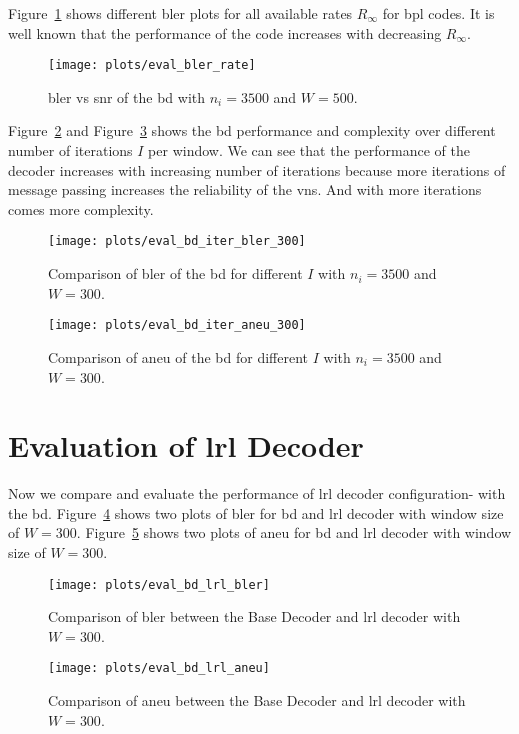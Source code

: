 Figure~\ref{fig:eval_bler_rate} shows different \ac{bler} plots for all available rates $R_\infty$ for \ac{bpl} codes. It is well known that the performance of the code increases with decreasing $R_\infty$.
\begin{figure}[htbp]
  \centering
  \texttt{[image: plots/eval\_bler\_rate]}
  \caption{\ac{bler} vs \ac{snr} of the \acl{bd} with $n_i=3500$ and $W=500$.}
  \label{fig:eval_bler_rate}
\end{figure}

Figure~\ref{fig:eval_bd_iter_bler_300} and Figure~\ref{fig:eval_bd_iter_aneu_300} shows the \ac{bd} performance and complexity over different number of iterations $I$ per window. We can see that the performance of the decoder increases with increasing number of iterations because more iterations of message passing increases the reliability of the \acp{vn}. And with more iterations comes more complexity.
\begin{figure}[htbp]
  \centering
  \texttt{[image: plots/eval\_bd\_iter\_bler\_300]}
  \caption{Comparison of \ac{bler} of the \acl{bd} for different $I$ with $n_i=3500$ and $W=300$.}
  \label{fig:eval_bd_iter_bler_300}
\end{figure}
\begin{figure}[htbp]
  \centering
  \texttt{[image: plots/eval\_bd\_iter\_aneu\_300]}
  \caption{Comparison of \ac{aneu} of the \acl{bd} for different $I$ with $n_i=3500$ and $W=300$.}
  \label{fig:eval_bd_iter_aneu_300}
\end{figure}

\section{Evaluation of \acl{lrl} Decoder}
Now we compare and evaluate the performance of \ac{lrl} decoder configuration- with the \ac{bd}. Figure~\ref{fig:eval_bd_lrl_bler} shows two plots of \ac{bler} for \ac{bd} and \ac{lrl} decoder with window size of $W=300$. Figure~\ref{fig:eval_bd_lrl_aneu} shows two plots of \ac{aneu} for \ac{bd} and \ac{lrl} decoder with window size of $W=300$.
\begin{figure}[htbp]
  \centering
  \texttt{[image: plots/eval\_bd\_lrl\_bler]}
  \caption{Comparison of \ac{bler} between the Base Decoder and \ac{lrl} decoder with $W=300$.}
  \label{fig:eval_bd_lrl_bler}
\end{figure}
\begin{figure}[htbp]
  \centering
  \texttt{[image: plots/eval\_bd\_lrl\_aneu]}
  \caption{Comparison of \ac{aneu} between the Base Decoder and \ac{lrl} decoder with $W=300$.}
  \label{fig:eval_bd_lrl_aneu}
\end{figure}


